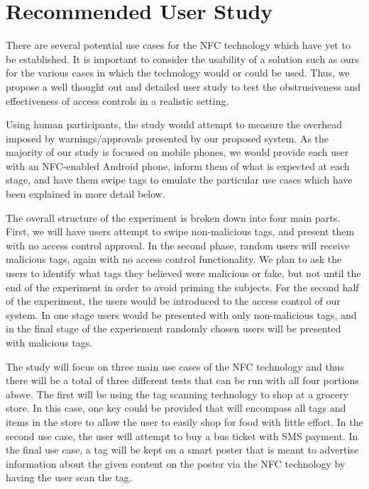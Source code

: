 \documentclass[12pt]{article}
\begin{document}

\section{Recommended User Study}
There are several potential use cases for the NFC technology which have yet to be established. It is important to consider the usability of a solution such as ours for the various cases in which the technology would or could be used. Thus, we propose a well thought out and detailed user study to test the obstrusiveness and effectiveness of access controls in a realistic setting. 

Using human participants, the study would attempt to measure the overhead imposed by warnings/approvals presented by our proposed system. As the majority of our study is focused on mobile phones, we would provide each user with an NFC-enabled Android phone, inform them of what is expected at each stage, and have them swipe tags to emulate the particular use cases which have been explained in more detail below.

The overall structure of the experiment is broken down into four main parts. First, we will have users attempt to swipe non-malicious tags, and present them with no access control approval. In the second phase, random users will receive malicious tags, again with no access control functionality. We plan to ask the users to identify what tags they believed were malicious or fake, but not until the end of the experiment in order to avoid priming the subjects. For the second half of the experiment, the users would be introduced to the access control of our system. In one stage users would be presented with only non-malicious tags, and in the final stage of the experiement randomly chosen users will be presented with malicious tags. 

The study will focus on three main use cases of the NFC technology and thus there will be a total of three different tests that can be run with all four portions above. The first will be using the tag scanning technology to shop at a grocery store. In this case, one key could be provided that will encompass all tags and items in the store to allow the user to easily shop for food with little effort. In the second use case, the user will attempt to buy a bus ticket with SMS payment. In the final use case, a tag will be kept on a smart poster that is meant to advertise information about the given content on the poster via the NFC technology by having the user scan the tag. 
\end{document}
